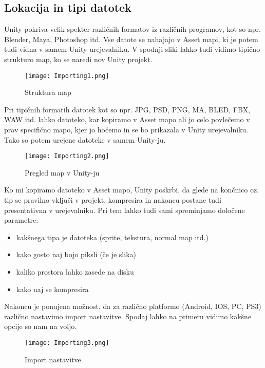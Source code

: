 {\color{indiagreen}\subsection{Lokacija in tipi datotek}}
Unity pokriva velik spekter različnih formatov iz različnih programov, kot so npr. Blender, Maya, Photoshop itd. Vse datote se nahajajo v Asset mapi, ki je potem tudi vidna v samem Unity urejevalniku. V spodnji sliki lahko tudi vidimo tipično strukturo map, ko se naredi nov Unity projekt.\\
\begin{figure}[ht!]
	\centering
	\texttt{[image: Importing1.png]}
	\caption{Struktura map}
\end{figure}
Pri tipičnih formatih datotek kot so npr. JPG, PSD, PNG, MA, BLED, FBX, WAW itd. lahko datoteko, kar kopiramo v Asset mapo ali jo celo povlečemo v prav specifično mapo, kjer jo hočemo in se bo prikazala v Unity urejevalniku. Tako so potem urejene datoteke v samem Unity-ju.\\
\begin{figure}[ht!]
	\centering
	\texttt{[image: Importing2.png]}
	\caption{Pregled map v Unity-ju}
\end{figure}
Ko mi kopiramo datoteko v Asset mapo, Unity poskrbi, da glede na končnico oz. tip se pravilno vključi v projekt, kompresira in nakoncu postane tudi presentativna v urejevalniku. Pri tem lahko tudi sami spreminjamo določene parametre:
\begin{itemize}
	\item kakšnega tipa je datoteka (sprite, tekstura, normal map itd.)
	\item kako gosto naj bojo piksli (če je slika)
	\item kaliko prostora lahko zasede na disku
	\item kako naj se kompresira
\end{itemize}
Nakoncu je ponujena možnost, da za različno platformo (Android, IOS, PC, PS3) različno nastavimo import nastavitve. Spodaj lahko na primeru vidimo kakšne opcije so nam na voljo.
\begin{figure}[ht!]
	\centering
	\texttt{[image: Importing3.png]}
	\caption{Import nastavitve}
\end{figure}